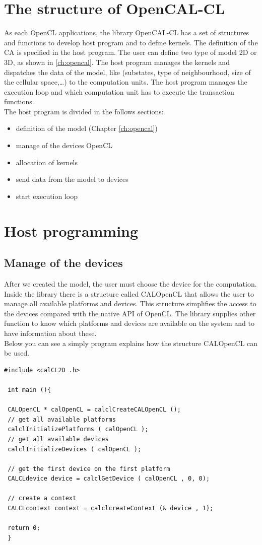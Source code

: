 \section{The structure of OpenCAL-CL}
As each OpenCL applications, the library OpenCAL-CL has a set of structures and
functions to develop host program and to define kernels. The definition of the
CA is specified in the host program. The user can define two type of model 2D or
3D, as shown in \ref{ch:opencal}. 
The host program manages the kernels and dispatches the data of the model, like (substates, type of neighbourhood, 
size of the cellular space,\ldots)
to the computation units.
The host program
manages the execution loop and which computation unit has to execute the
transaction functions. \\
The host program is divided in the follows sections:
\begin{itemize}
\item definition of the model (Chapter \ref{ch:opencal}) 
\item manage of the devices OpenCL
\item allocation of kernels
\item send data from the model to devices
\item start execution loop
\end{itemize}

\section{Host programming} 

\subsection{Manage of the devices}

After we created the model, the user must choose the device for the computation.
Inside the library there is a structure called CALOpenCL that allows the user to manage all 
available platforms and devices.
This structure simplifies the access to the devices compared with the native API
of OpenCL. The library supplies other function to know which platforms and
devices are available on the system and to have information about these.\\
Below you can see a simply program explains how the structure
CALOpenCL can be used.


\begin{lstlisting}
#include <calCL2D .h>

 int main (){

 CALOpenCL * calOpenCL = calclCreateCALOpenCL ();
 // get all available platforms
 calclInitializePlatforms ( calOpenCL );
 // get all available devices
 calclInitializeDevices ( calOpenCL );

 // get the first device on the first platform
 CALCLdevice device = calclGetDevice ( calOpenCL , 0, 0);

 // create a context
 CALCLcontext context = calclcreateContext (& device , 1);

 return 0;
 }
\end{lstlisting}

